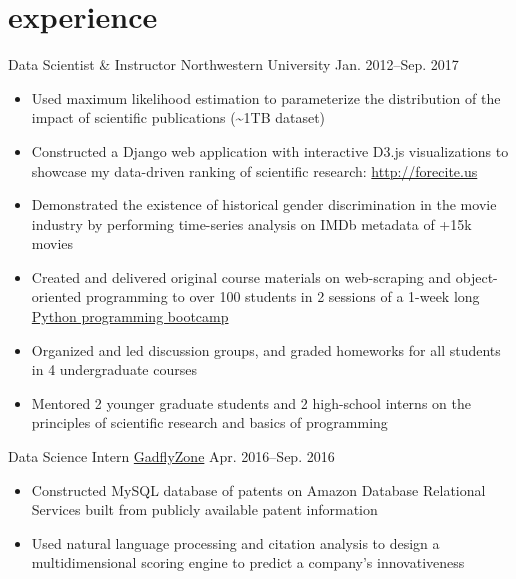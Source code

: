 
\section{experience}

\begin{entrylist}


\entry
{Data Scientist \& Instructor}
{Northwestern University}
{Jan. 2012--Sep. 2017}
{\begin{itemize}
\item Used maximum likelihood estimation to parameterize the distribution of the impact of scientific publications (\textasciitilde1TB dataset)
\item Constructed a Django web application with interactive D3.js visualizations to showcase my data-driven ranking of scientific research: \href{http://forecite.us}{http://forecite.us}
\item Demonstrated the existence of historical gender discrimination in the movie industry by performing time-series analysis on IMDb metadata of +15k movies
\item Created and delivered original course materials on web-scraping and object-oriented programming to over 100 students in 2 sessions of a 1-week long \href{https://amarallab.github.io/Introduction-to-Python-Programming-and-Data-Science/}{Python programming bootcamp}
\item Organized and led discussion groups, and graded homeworks for all students in 4 undergraduate courses
\item Mentored 2 younger graduate students and 2 high-school interns on the principles of scientific research and basics of programming
\end{itemize}}


\entry
{Data Science Intern}
{\href{http://gadflyzone.com/}{GadflyZone}}
{Apr. 2016--Sep. 2016}
{\begin{itemize}
\item Constructed MySQL database of patents on Amazon Database Relational Services built from publicly available patent information
\item Used natural language processing and citation analysis to design a multidimensional scoring engine to predict a company's innovativeness
\end{itemize}}


\end{entrylist}

